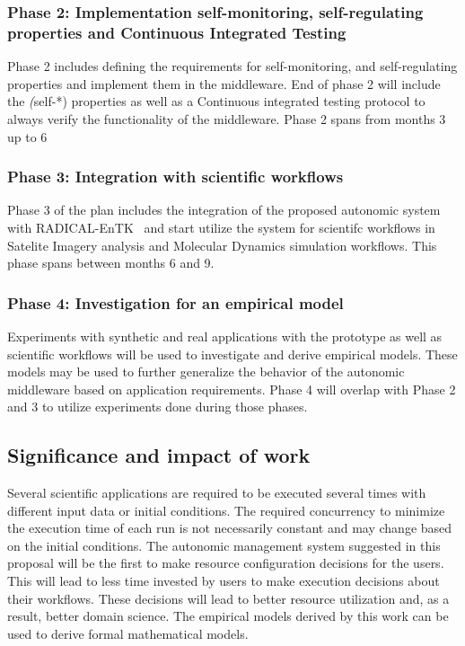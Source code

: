 \subsubsection{Phase 2: Implementation self-monitoring, self-regulating properties
and Continuous Integrated Testing}
Phase 2 includes defining the requirements for self-monitoring, and self-regulating 
properties and implement them in the middleware. End of phase 2 will include the 
\textit(self-*) properties as well as a Continuous integrated testing protocol to 
always verify the functionality of the middleware. Phase 2 spans from months 3 up 
to 6

\subsubsection{Phase 3: Integration with scientific workflows}
Phase 3 of the plan includes the integration of the proposed autonomic system with 
RADICAL-EnTK~\cite{balasubramanian2018harnessing} and start utilize the system for 
scientifc workflows in Satelite Imagery analysis and Molecular Dynamics simulation 
workflows. This phase spans between months 6 and 9.

\subsubsection{Phase 4: Investigation for an empirical model}

Experiments with synthetic and real applications with the prototype as well as 
scientific workflows will be used to investigate and derive empirical models. 
These models may be used to further generalize the behavior of the autonomic 
middleware based on application requirements. Phase 4 will overlap with Phase 2 
and 3 to utilize experiments done during those phases.

\subsection{Significance and impact of work}
Several scientific applications are required to be executed several times with 
different input data or initial conditions. The required concurrency to minimize 
the execution time of each run is not necessarily constant and may change based 
on the initial conditions. The autonomic management system suggested in this 
proposal will be the first to make resource configuration decisions for the users. 
This will lead to less time invested by users to make execution decisions about 
their workflows. These decisions will lead to better resource utilization and, 
as a result, better domain science. The empirical models derived by this work can 
be used to derive formal mathematical models.

